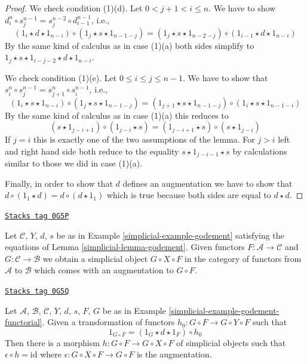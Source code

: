 \begin{proof}
\medskip\noindent
We check condition (1)(d). Let $0 < j + 1 < i \leq n$. We have to show
$d^n_i \circ s^{n - 1}_j = s^{n - 2}_j \circ d^{n - 1}_{i - 1}$, i.e.,
$$
(1_i \star d \star 1_{n - i}) \circ
(1_j \star s \star 1_{n - 1 - j}) =
(1_j \star s \star 1_{n - 2 - j}) \circ
(1_{i - 1} \star d \star 1_{n - i})
$$
By the same kind of calculus as in case (1)(a) both sides simplify
to $1_j \star s \star 1_{i - j - 2} \star d \star 1_{n - i}$.

\medskip\noindent
We check condition (1)(e). Let $0 \leq i \leq j \leq n - 1$. We
have to show that
$s^n_i \circ s^{n - 1}_j = s^n_{j + 1} \circ s^{n - 1}_i$, i.e.,
$$
(1_i \star s \star 1_{n - i}) \circ
(1_j \star s \star 1_{n - 1 - j}) =
(1_{j + 1} \star s \star 1_{n - 1 - j}) \circ
(1_i \star s \star 1_{n - 1 - i})
$$
By the same kind of calculus as in case (1)(a) this reduces to
$$
(s \star 1_{j - i + 1}) \circ (1_{j - i} \star s) =
(1_{j - i + 1} \star s) \circ (s \star 1_{j - i})
$$
If $j = i$ this is exactly one of the two assumptions of the lemma.
For $j > i$ left and
right hand side both reduce to the equality $s \star 1_{j - i - 1} \star s$
by calculations similar to those we did in case (1)(a).

\medskip\noindent
Finally, in order to show that $d$ defines an augmentation we have
to show that $d \circ (1_1 \star d) = d \circ (d \star 1_1)$ which is
true because both sides are equal to $d \star d$.
\end{proof}

\begin{example}
\label{simplicial-example-godement-functorial}
\href{https://stacks.math.columbia.edu/tag/0G5P}{\texttt{Stacks tag 0G5P}}

Let $\mathcal{C}$, $Y$, $d$, $s$ be as in Example \ref{simplicial-example-godement}
satisfying the equations of Lemma \ref{simplicial-lemma-godement}.
Given functors $F : \mathcal{A} \to \mathcal{C}$ and
$G : \mathcal{C} \to \mathcal{B}$ we obtain a simplicial
object $G \circ X \circ F$ in the category of functors
from $\mathcal{A}$ to $\mathcal{B}$ which comes with an
augmentation to $G \circ F$.
\end{example}

\begin{lemma}
\label{simplicial-lemma-godement-section}
\href{https://stacks.math.columbia.edu/tag/0G5Q}{\texttt{Stacks tag 0G5Q}}

Let $\mathcal{A}$, $\mathcal{B}$, $\mathcal{C}$, $Y$, $d$, $s$, $F$, $G$
be as in Example \ref{simplicial-example-godement-functorial}. Given a transformation
of functors $h_0 : G \circ F \to G \circ Y \circ F$ such that
$$
1_{G \circ F} = (1_G \star d \star 1_F) \circ h_0
$$
Then there is a morphism $h : G \circ F \to G \circ X \circ F$
of simplicial objects such that $\epsilon \circ h = \text{id}$ where
$\epsilon : G \circ X \circ F \to G \circ F$ is the augmentation.
\end{lemma}

